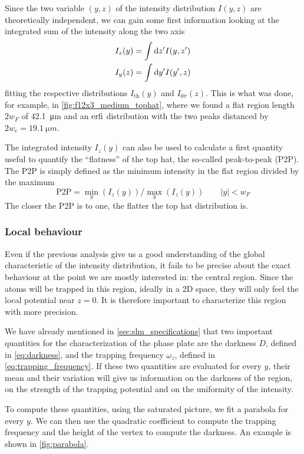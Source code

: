 Since the two variable $(y,z)$ of the intensity distribution $I(y,z)$ are theoretically independent, we can gain some first information looking at the integrated sum of the intensity along the two axis
\begin{align}
    I_z(y) & = \int \differential z' I(y,z') \\
    I_y(z) & = \int \differential y' I(y',z)
\end{align}
fitting the respective distributions $I_\text{th}(y)$ and $I_{0\pi}(z)$. This is what was done, for example, in \cref{fig:f12x3_medium_tophat}, where we found a flat region length $2w_F$ of \SI{42.1}{\micro m} and an $\text{erfi}$ distribution with the two peaks distanced by $2w_e = \SI{19.1}{\micro m}$.

The integrated intensity $I_z(y)$ can also be used to calculate a first quantity useful to quantify the \enquote{flatness} of the top hat, the so-called peak-to-peak (P2P). The P2P is simply defined as the minimum intensity in the flat region divided by the maximum
\begin{equation}
    \text{P2P} = \min_y(I_z(y)) / \max_y(I_z(y)) \qquad |y| < w_F
\end{equation}
The closer the P2P is to one, the flatter the top hat distribution is.

\subsubsection{Local behaviour}
Even if the previous analysis give us a good understanding of the global characteristic of the intensity distribution, it fails to be precise about the exact behaviour at the point we are mostly interested in: the central region. Since the atoms will be trapped in this region, ideally in a 2D space, they will only feel the local potential near $z=0$. It is therefore important to characterize this region with more precision.

We have already mentioned in \cref{sec:slm_specifications} that two important quantities for the characterization of the phase plate are the darkness $D$, defined in \cref{eq:darkness}, and the trapping frequency $\omega_z$, defined in \cref{eq:trapping_frequency}. If these two quantities are evaluated for every $y$, their mean and their variation will give us information on the darkness of the region, on the strength of the trapping potential and on the uniformity of the intensity.

To compute these quantities, using the saturated picture, we fit a parabola for every $y$. We can then use the quadratic coefficient to compute the trapping frequency and the height of the vertex to compute the darkness. An example is shown in \cref{fig:parabola}.

